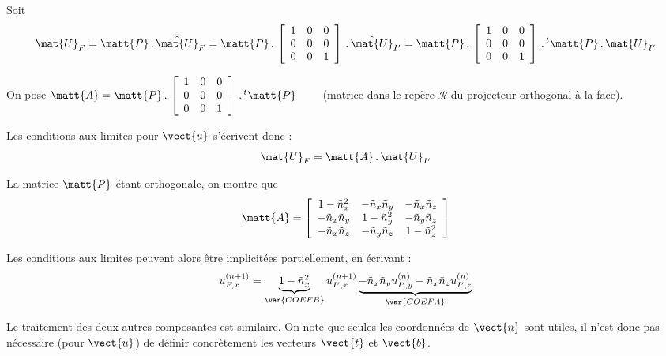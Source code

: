 Soit
\begin{equation}
\mat{U}_F = \matt{P}\,.\,\hat{\mat{U}}_F
= \matt{P}\,.\,\left[
\begin{array}{ccc}
1 & 0 & 0\\
0 & 0 & 0\\
0 & 0 & 1
\end{array}
\right]\,.\,\hat{\mat{U}}_{I'}
=\matt{P}\,.\,\left[
\begin{array}{ccc}
1 & 0 & 0\\
0 & 0 & 0\\
0 & 0 & 1
\end{array}
\right]\,.\,^t\matt{P}\,.\,\mat{U}_{I'}
\end{equation}


On pose
$\matt{A}=\matt{P}\,.\,\left[
\begin{array}{ccc}
1 & 0 & 0\\
0 & 0 & 0\\
0 & 0 & 1
\end{array}
\right]\,.\,^t\matt{P}\qquad$ (matrice dans le rep\`ere $\mathcal{R}$ du projecteur
orthogonal \`a la face).

Les conditions aux limites pour $\vect{u}$ s'\'ecrivent donc :
\begin{equation}
\mat{U}_F = \matt{A}\,.\,\mat{U}_{I'}
\end{equation}

La matrice $\matt{P}$ \'etant orthogonale, on montre que
\begin{equation}
\matt{A}=\left[
\begin{array}{ccc}
1-\tilde{n}_x^2 & -\tilde{n}_x\tilde{n}_y & -\tilde{n}_x\tilde{n}_z\\
-\tilde{n}_x\tilde{n}_y & 1-\tilde{n}_y^2 & -\tilde{n}_y\tilde{n}_z\\
-\tilde{n}_x\tilde{n}_z & -\tilde{n}_y\tilde{n}_z & 1-\tilde{n}_z^2
\end{array}\right]
\end{equation}

Les conditions aux limites peuvent alors \^etre implicit\'ees partiellement, en
\'ecrivant :
\begin{equation}
\label{Base_Clsyvt_eq_clU}
u_{F,x}^{(n+1)} = \underbrace{1-\tilde{n}_x^2}_{\var{COEFB}}u_{I',x}^{(n+1)}
\underbrace{-\tilde{n}_x\tilde{n}_y u_{I',y}^{(n)}
-\tilde{n}_x\tilde{n}_z u_{I',z}^{(n)}}_{\var{COEFA}}
\end{equation}

Le traitement des deux autres composantes est similaire. On note que seules les
coordonn\'ees de $\vect{n}$ sont utiles, il n'est donc pas n\'ecessaire (pour
$\vect{u}$) de d\'efinir concr\`etement les vecteurs $\vect{t}$ et $\vect{b}$.

